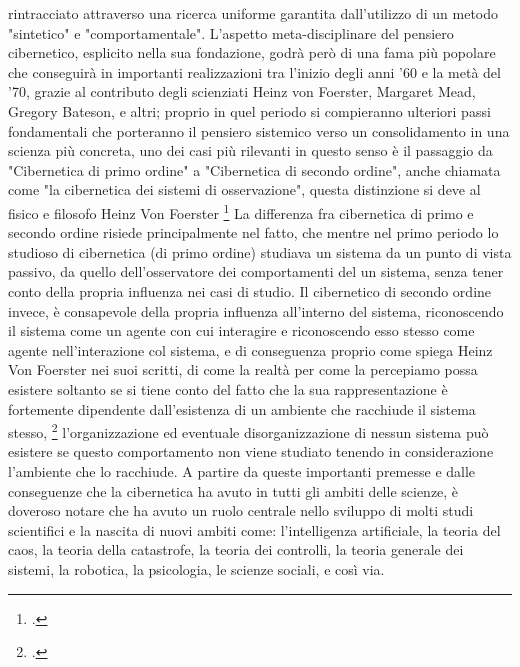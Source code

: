 rintracciato attraverso una ricerca uniforme
garantita dall'utilizzo di un metodo
"sintetico" e "comportamentale". 
L'aspetto meta-disciplinare del pensiero cibernetico,
esplicito nella sua fondazione, godrà però di una fama più popolare 
che conseguirà in importanti realizzazioni 
tra l'inizio degli anni '60 e la metà del '70, 
grazie al contributo degli scienziati
Heinz von Foerster, Margaret Mead, Gregory Bateson, e altri;
proprio in quel periodo si compieranno ulteriori passi fondamentali che porteranno
il pensiero sistemico verso un consolidamento in una scienza più concreta,
uno dei casi più rilevanti in questo senso è il passaggio da "Cibernetica di primo ordine"
a "Cibernetica di secondo ordine", anche chiamata come "la cibernetica dei sistemi di osservazione",
questa distinzione si deve al fisico e filosofo Heinz Von Foerster \footcite{scottsecondordercyb}
La differenza fra cibernetica di primo e secondo ordine risiede principalmente nel fatto,
che mentre nel primo periodo lo studioso di cibernetica (di primo ordine)
studiava un sistema da un punto di vista passivo, da quello dell'osservatore
dei comportamenti del un sistema, senza tener conto della propria influenza 
nei casi di studio.
Il  cibernetico di secondo ordine invece, è consapevole della propria 
influenza all'interno del sistema, riconoscendo il sistema come un agente con cui interagire e
riconoscendo esso stesso come agente nell'interazione col sistema, 
e di conseguenza proprio come spiega Heinz Von Foerster nei suoi scritti,
di come la realtà per come la percepiamo possa esistere
soltanto se si tiene conto del fatto che la sua rappresentazione è fortemente dipendente 
dall'esistenza di un ambiente che racchiude il sistema stesso, \footcite{understandingunderstanding}
l'organizzazione ed eventuale disorganizzazione di nessun sistema può esistere 
se questo comportamento non viene studiato tenendo in considerazione l'ambiente che lo racchiude.
A partire da queste importanti premesse e dalle conseguenze 
che la cibernetica ha avuto in tutti gli ambiti delle scienze, è doveroso 
notare che ha avuto un ruolo centrale nello sviluppo di
molti studi scientifici e la nascita
di nuovi ambiti come: l'intelligenza artificiale, la teoria del caos,
la teoria della catastrofe,
la teoria dei controlli, la teoria generale dei sistemi, la robotica,
la psicologia, le scienze sociali, e così via.


